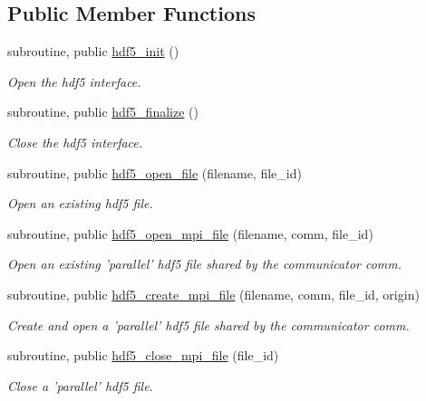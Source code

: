 \subsection*{Public Member Functions}
\begin{DoxyCompactItemize}
\item 
subroutine, public \hyperlink{classmodhdf5_a78ec7a0bfdcd60f1ce1ecf0c88bb7cd9}{hdf5\-\_\-init} ()
\begin{DoxyCompactList}\small\item\em Open the hdf5 interface. \end{DoxyCompactList}\item 
subroutine, public \hyperlink{classmodhdf5_ace643e6a3e592dbe1be4d158888eb477}{hdf5\-\_\-finalize} ()
\begin{DoxyCompactList}\small\item\em Close the hdf5 interface. \end{DoxyCompactList}\item 
subroutine, public \hyperlink{classmodhdf5_a11539d06d180bff29d3c56ba198451d4}{hdf5\-\_\-open\-\_\-file} (filename, file\-\_\-id)
\begin{DoxyCompactList}\small\item\em Open an existing hdf5 file. \end{DoxyCompactList}\item 
subroutine, public \hyperlink{classmodhdf5_a9f6976ee158485f6b203635df23156e3}{hdf5\-\_\-open\-\_\-mpi\-\_\-file} (filename, comm, file\-\_\-id)
\begin{DoxyCompactList}\small\item\em Open an existing 'parallel' hdf5 file shared by the communicator comm. \end{DoxyCompactList}\item 
subroutine, public \hyperlink{classmodhdf5_a0382a4721335fbb49e1cb9cd48cfea0a}{hdf5\-\_\-create\-\_\-mpi\-\_\-file} (filename, comm, file\-\_\-id, origin)
\begin{DoxyCompactList}\small\item\em Create and open a 'parallel' hdf5 file shared by the communicator comm. \end{DoxyCompactList}\item 
subroutine, public \hyperlink{classmodhdf5_a72cb805582425e8633c70c5db85df8bc}{hdf5\-\_\-close\-\_\-mpi\-\_\-file} (file\-\_\-id)
\begin{DoxyCompactList}\small\item\em Close a 'parallel' hdf5 file. \end{DoxyCompactList}\item 

\end{DoxyCompactItemize}
